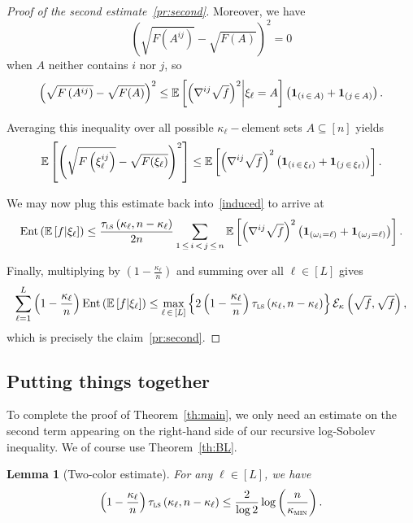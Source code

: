 \documentclass[10pt]{amsart}
\newtheorem{lemm}[theo]{Lemma}\newtheorem{prop}[theo]{Proposition}\newtheorem{coro}[theo]{Corollary}\newtheorem{conj}[theo]{Conjecture}
\theoremstyle{definition}\newtheorem{defi}[theo]{Definition}\newtheorem{rema}[theo]{Remark}\newtheorem{exam}[theo]{Example}\newtheorem{exem}[theo]{Example}\newtheorem{nota}[theo]{Notation}
\newcommand{\EE}{\mathbb{E}}
\newcommand{\cE}{\mathcal{E}}
\newcommand{\tls}{\tau_{\textsc{ls}}}
\newcommand{\am}{{\kappa_{\textsc{min}}}}
\newcommand{\bfun}{\bf 1}
\DeclareMathOperator{\ent}{Ent}
\begin{document}
\begin{proof}[Proof of the second estimate~\eqref{pr:second}]
Moreover, we have
\[
\left(\sqrt{F\left(A^{ij}\right)}-\sqrt{F(A)}\right)^2=0
\]
when $A$ neither contains $i$ nor $j$, so
\[
\left(\sqrt{F\left(A^{ij}\right)}-\sqrt{F(A)}\right)^2 \le \EE\left[\left(\nabla^{ij} \sqrt{f}\right)^2\middle|\xi_\ell=A\right]\left({\bfun}_{(i\,\in\,A)}+{\bfun}_{(j\,\in\,A)}\right).
\]

Averaging this inequality over all possible $\kappa_\ell-$element sets $A\subseteq[n]$ yields
\[
\EE\left[\left(\sqrt{F\left(\xi_\ell^{ij}\right)}-\sqrt{F(\xi_\ell)}\right)^2\right] \le \EE\left[\left(\nabla^{ij} \sqrt{f}\right)^2\left({\bfun}_{(i\,\in\,\xi_\ell)}+{\bfun}_{(j\,\in\,\xi_\ell)}\right)\right].
\]

We may now plug this estimate back into~\eqref{induced} to arrive at
\[
\ent\left(\EE\left[f\middle|\xi_\ell\right]\right) \le \frac{\tls\left(\kappa_\ell,n-\kappa_\ell\right)}{2n}\sum_{1\,\le\,i\,<\,j\,\le\,n}\EE\left[\left(\nabla^{ij} \sqrt{f}\right)^2\left({\bfun}_{\left(\omega_i=\ell\right)}+{\bfun}_{\left(\omega_j=\ell\right)}\right)\right].
\]

Finally, multiplying by $\left(1-\frac{\kappa_\ell}{n}\right)$ and summing over all $\ell\in[L]$ gives
\[
\sum_{\ell=1}^L\left(1-\frac{\kappa_\ell}{n}\right)\ent\left(\EE\left[f\middle|\xi_\ell\right]\right) \le \max_{\ell\,\in\,[L]}\left\{2\left(1-\frac{\kappa_\ell}n\right)\tls\left(\kappa_\ell,n-\kappa_\ell\right)\right\}\cE_\kappa\left(\sqrt{f},\sqrt{f}\right),
\]
which is precisely the claim~\eqref{pr:second}.
\end{proof}

\subsection{Putting things together}\label{sec:final}

To complete the proof of Theorem~\ref{th:main}, we only need an estimate on the second term appearing on the right-hand side of our recursive log-Sobolev inequality. We of course use Theorem~\ref{th:BL}.

\begin{lemm}[Two-color estimate]\label{lm:L2}
For any $\ell\in[L]$, we have
\[
\left(1-\frac{\kappa_\ell}{n}\right)\tls\left(\kappa_\ell,n-\kappa_\ell\right) \le \frac{2}{\log 2}\log\left(\frac{n}{\am}\right).
\]
\end{lemm}
\end{document}

